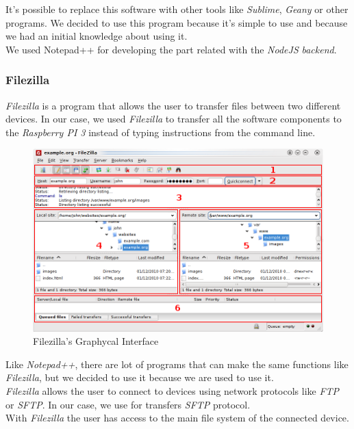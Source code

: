 It's possible to replace this software with other tools like \textit{Sublime}, \textit{Geany} or other programs. We decided to use this program because it's simple to use and because we had an initial knowledge about using it.\\

We used Notepad++ for developing the part related with the \textit{NodeJS} \textit{backend}.

\subsubsection{Filezilla}

\textit{Filezilla} is a program that allows the user to transfer files between two different devices. In our case, we used \textit{Filezilla} to transfer all the software components to the \textit{Raspberry PI 3} instead of typing instructions from the command line.\\

\begin{figure}[H]
\begin{centering}
\includegraphics[scale=0.9]{IMGS/FILEZILLA.png}
\caption{Filezilla's Graphycal Interface \label{FILEZILLA}}
\end{centering}
\end{figure}

Like \textit{Notepad++}, there are lot of programs that can make the same functions like \textit{Filezilla}, but we decided to use it because we are used to use it.\\

\textit{Filezilla} allows the user to connect to devices using network protocols like \textit{FTP} or \textit{SFTP}. In our case, we use for transfers \textit{SFTP} protocol.\\

With \textit{Filezilla} the user has access to the main file system of the connected device.

